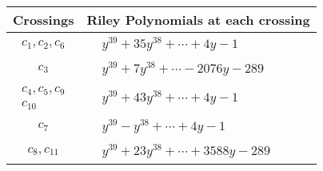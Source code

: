 \documentclass[1p]{elsarticle_modified}
\theoremstyle{definition}
\begin{document}
\begin{tabular}{m{50pt}|m{274pt}}
Crossings & \hspace{64pt}Riley Polynomials at each crossing \\
\hline $$\begin{aligned}c_{1},c_{2},c_{6}\end{aligned}$$&$\begin{aligned}
&y^{39}+35 y^{38}+\cdots+4 y-1
\end{aligned}$\\
\hline $$\begin{aligned}c_{3}\end{aligned}$$&$\begin{aligned}
&y^{39}+7 y^{38}+\cdots-2076 y-289
\end{aligned}$\\
\hline $$\begin{aligned}c_{4},c_{5},c_{9}\\c_{10}\end{aligned}$$&$\begin{aligned}
&y^{39}+43 y^{38}+\cdots+4 y-1
\end{aligned}$\\
\hline $$\begin{aligned}c_{7}\end{aligned}$$&$\begin{aligned}
&y^{39}- y^{38}+\cdots+4 y-1
\end{aligned}$\\
\hline $$\begin{aligned}c_{8},c_{11}\end{aligned}$$&$\begin{aligned}
&y^{39}+23 y^{38}+\cdots+3588 y-289
\end{aligned}$\\
\hline
\end{tabular}
\vskip 2pc
\end{document}
